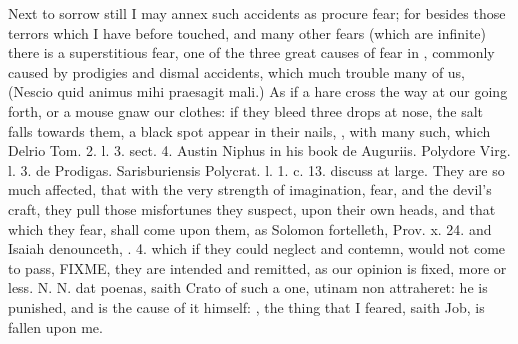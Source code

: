 {Next to sorrow still I may annex such accidents as procure fear; for
besides those terrors which I have before touched, and many other
fears (which are infinite) there is a superstitious fear, one of the
three great causes of fear in \Aristotle, commonly caused by prodigies
and dismal accidents, which much trouble many of us, (Nescio quid
animus mihi praesagit mali.) As if a hare cross the way at our going
forth, or a mouse gnaw our clothes: if they bleed three drops at nose,
the salt falls towards them, a black spot appear in their nails, \etc{},
with many such, which Delrio Tom. 2. l. 3. sect. 4. Austin Niphus in
his book de Auguriis. Polydore Virg. l. 3. de Prodigas. Sarisburiensis
Polycrat. l. 1. c. 13. discuss at large. They are so much affected,
that with the very strength of imagination, fear, and the devil's
craft, they pull those misfortunes they suspect, upon their own
heads, and that which they fear, shall come upon them, as Solomon
fortelleth, Prov. x. 24. and Isaiah denounceth, . 4. which if
they could neglect and contemn, would not come to pass, FIXME, they are intended and remitted, as our opinion is fixed,
more or less. N. N. dat poenas, saith Crato of such a one, utinam
non attraheret: he is punished, and is the cause of it  himself:
, the thing that I feared,
saith Job, is fallen upon me.

}
